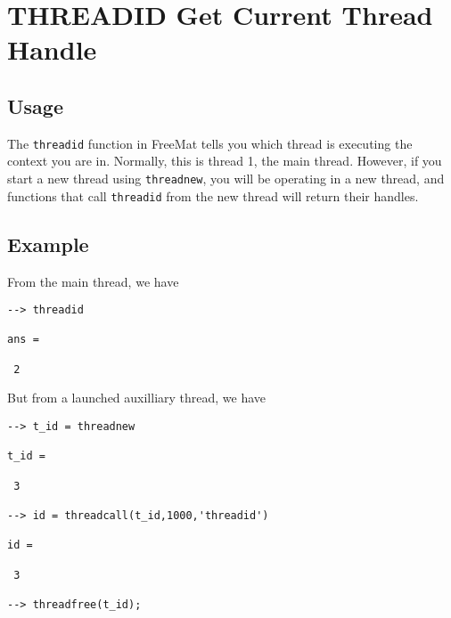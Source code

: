 \section{THREADID Get Current Thread Handle}

\subsection{Usage}

The \verb|threadid| function in FreeMat tells you which thread
is executing the context you are in.  Normally, this is thread
1, the main thread.  However, if you start a new thread using
\verb|threadnew|, you will be operating in a new thread, and functions
that call \verb|threadid| from the new thread will return their 
handles.
\subsection{Example}

From the main thread, we have
\begin{verbatim}
--> threadid

ans = 

 2 
\end{verbatim}
But from a launched auxilliary thread, we have
\begin{verbatim}
--> t_id = threadnew

t_id = 

 3 

--> id = threadcall(t_id,1000,'threadid')

id = 

 3 

--> threadfree(t_id);
\end{verbatim}
